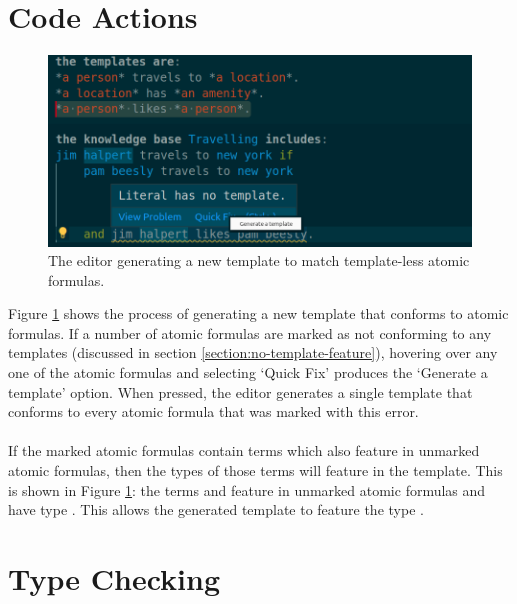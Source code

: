\documentclass[../main.tex]{subfiles}
\begin{document}
\section{Code Actions}
\begin{figure}[h!]
\centering
\includegraphics[width = \linewidth]{./figures/generate-template-full.png}
\caption{The editor generating a new template to match template-less atomic formulas.}
\label{fig:new-template}
\end{figure}
Figure \ref{fig:new-template} shows the process of generating a new template that conforms to atomic formulas. If a number of atomic formulas are marked as not conforming to any templates (discussed in section \ref{section:no-template-feature}), hovering over any one of the atomic formulas and selecting `Quick Fix' produces the `Generate a template' option. When pressed, the editor generates a single template that conforms to every atomic formula that was marked with this error. 
\\
\\
If the marked atomic formulas contain terms which also feature in unmarked atomic formulas, then the types of those terms will feature in the template. This is shown in Figure \ref{fig:new-template}: the terms  and  feature in unmarked atomic formulas and have type . This allows the generated template to feature the type .

\section{Type Checking}
\end{document}
